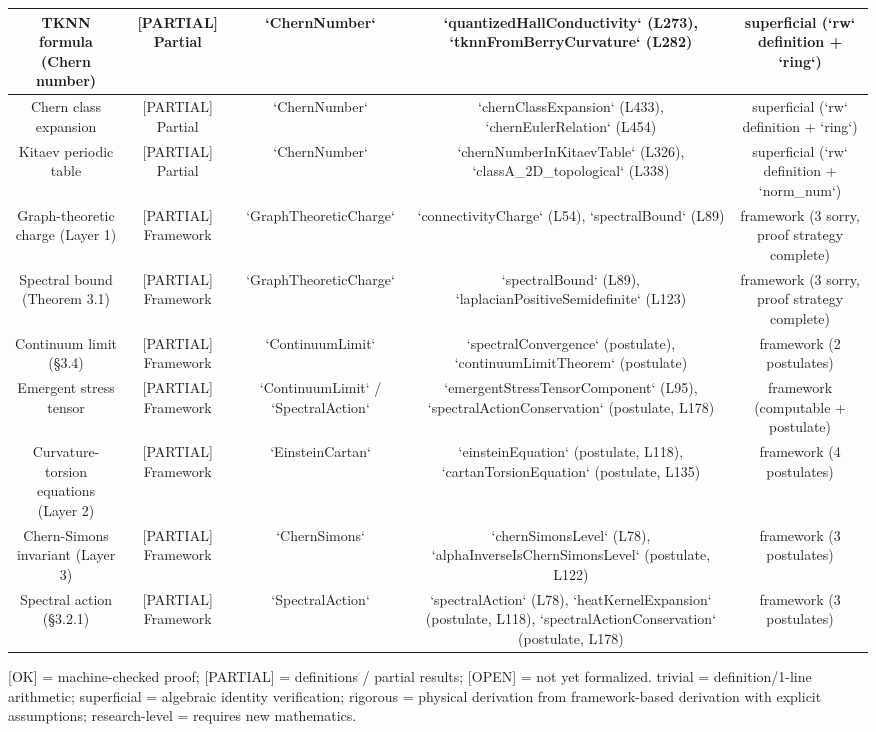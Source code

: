 \documentclass[11pt,a4paper]{article}
\theoremstyle{plain}
\theoremstyle{definition}
\begin{document}
\begin{table}[h]
\begin{tabular}{|c|c|c|c|c|}
TKNN formula (Chern number) & [PARTIAL] Partial & `ChernNumber` & `quantizedHallConductivity` (L273), `tknnFromBerryCurvature` (L282) & superficial (`rw` definition + `ring`) \\ \hline
Chern class expansion & [PARTIAL] Partial & `ChernNumber` & `chernClassExpansion` (L433), `chernEulerRelation` (L454) & superficial (`rw` definition + `ring`) \\ \hline
Kitaev periodic table & [PARTIAL] Partial & `ChernNumber` & `chernNumberInKitaevTable` (L326), `classA_2D_topological` (L338) & superficial (`rw` definition + `norm_num`) \\ \hline
Graph-theoretic charge (Layer 1) & [PARTIAL] Framework & `GraphTheoreticCharge` & `connectivityCharge` (L54), `spectralBound` (L89) & framework (3 sorry, proof strategy complete) \\ \hline
Spectral bound (Theorem 3.1) & [PARTIAL] Framework & `GraphTheoreticCharge` & `spectralBound` (L89), `laplacianPositiveSemidefinite` (L123) & framework (3 sorry, proof strategy complete) \\ \hline
Continuum limit (§3.4) & [PARTIAL] Framework & `ContinuumLimit` & `spectralConvergence` (postulate), `continuumLimitTheorem` (postulate) & framework (2 postulates) \\ \hline
Emergent stress tensor & [PARTIAL] Framework & `ContinuumLimit` / `SpectralAction` & `emergentStressTensorComponent` (L95), `spectralActionConservation` (postulate, L178) & framework (computable + postulate) \\ \hline
Curvature-torsion equations (Layer 2) & [PARTIAL] Framework & `EinsteinCartan` & `einsteinEquation` (postulate, L118), `cartanTorsionEquation` (postulate, L135) & framework (4 postulates) \\ \hline
Chern-Simons invariant (Layer 3) & [PARTIAL] Framework & `ChernSimons` & `chernSimonsLevel` (L78), `alphaInverseIsChernSimonsLevel` (postulate, L122) & framework (3 postulates) \\ \hline
Spectral action (§3.2.1) & [PARTIAL] Framework & `SpectralAction` & `spectralAction` (L78), `heatKernelExpansion` (postulate, L118), `spectralActionConservation` (postulate, L178) & framework (3 postulates) \\ \hline
\end{tabular}
\end{table}


\textbf{\1} [OK] = machine-checked proof; [PARTIAL] = definitions / partial results; [OPEN] = not yet formalized.
\textbf{\1} trivial = definition/1-line arithmetic; superficial = algebraic identity verification; rigorous = physical derivation from framework-based derivation with explicit assumptions; research-level = requires new mathematics.
\end{document}
